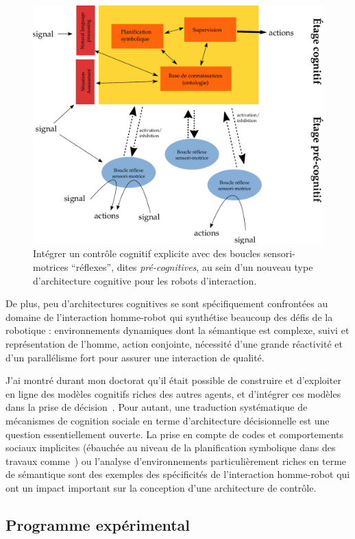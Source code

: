 \documentclass[a4paper]{article}
\begin{document}
\begin{figure}
    \centering
    \includegraphics[width=0.8\linewidth]{archi}
    \caption{\small Intégrer un contrôle cognitif explicite avec des boucles
        sensori-motrices ``réflexes'', dites \emph{pré-cognitives}, au sein
    d'un nouveau type d'architecture cognitive pour les robots d'interaction.}
    \label{}
\end{figure}


De plus, peu d'architectures cognitives se sont spécifiquement confrontées au
domaine de l'interaction homme-robot qui synthétise beaucoup des défis de la
robotique : environnements dynamiques dont la sémantique est complexe, suivi et
représentation de l'homme, action conjointe, nécessité d'une grande réactivité
et d'un parallélisme fort pour assurer une interaction de qualité.

J'ai montré durant mon doctorat qu'il était possible de construire et
d'exploiter en ligne des modèles cognitifs riches des autres agents, et
d'intégrer ces modèles dans la prise de décision~\cite{alami2011when,
warnier2012when, lemaignan2014human}.  Pour autant, une traduction systématique
de mécanismes de cognition sociale en terme d'architecture décisionnelle est une
question essentiellement ouverte. La prise en compte de codes et comportements
sociaux implicites (ébauchée au niveau de la planification symbolique dans des
travaux comme~\cite{Alili2009}) ou l'analyse d'environnements particulièrement
riches en terme de sémantique sont des exemples des spécificités de
l'interaction homme-robot qui ont un impact important sur la conception d'une
architecture de contrôle.


\subsection*{Programme expérimental}
\end{document}
